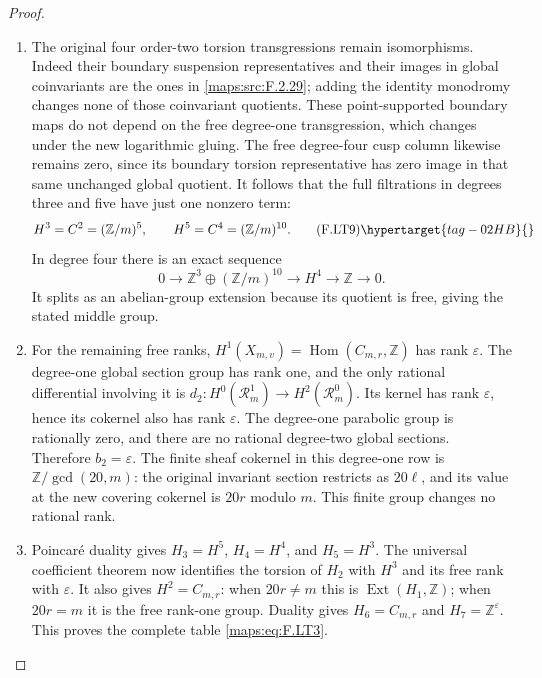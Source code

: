 \begin{proof}
\begin{enumerate}[label={$\langle1\rangle$\arabic*.}]
\item The original four order-two torsion transgressions
remain isomorphisms.
Indeed their boundary suspension representatives and
their images in global coinvariants are the ones in
\ref{maps:src:F.2.29}; adding the identity monodromy changes none
of those coinvariant quotients.
These point-supported boundary maps do not depend
on the free degree-one transgression, which changes
under the new logarithmic gluing.
The free degree-four cusp column likewise remains
zero, since its boundary torsion representative has
zero image in that same unchanged global quotient.
It follows that the full filtrations in degrees
three and five have just one nonzero term:
\[
 H^3=C^2=(\mathbb Z/m)^5,\qquad
 H^5=C^4=(\mathbb Z/m)^{10}.
\tag{F.LT9}\hypertarget{tag-02HB}{}\label{maps:eq:F.LT9}
\]
In degree four there is an exact sequence
\[
 0\longrightarrow
       \mathbb Z^3\oplus(\mathbb Z/m)^{10}
  \longrightarrow H^4
  \longrightarrow\mathbb Z\longrightarrow0.
\]
It splits as an abelian-group extension because
its quotient is free, giving the stated middle group.

\item For the remaining free ranks,
$H^1(X_{m,v})=\operatorname{Hom}(C_{m,r},\mathbb Z)$
has rank $\varepsilon$.
The degree-one global section group has rank one,
and the only rational differential involving it is
$d_2:H^0(\mathcal R_m^1)\to H^2(\mathcal R_m^0)$.
Its kernel has rank $\varepsilon$, hence its
cokernel also has rank $\varepsilon$.
The degree-one parabolic group is rationally zero,
and there are no rational degree-two global sections.
Therefore $b_2=\varepsilon$.
The finite sheaf cokernel in this degree-one row is
$\mathbb Z/\gcd(20,m)$: the original invariant
section restricts as $20\ell$, and its value at
the new covering cokernel is $20r$ modulo $m$.
This finite group changes no rational rank.

\item Poincar\'e duality gives
$H_3=H^5$, $H_4=H^4$, and $H_5=H^3$.
The universal coefficient theorem now identifies
the torsion of $H_2$ with $H^3$ and its free rank
with $\varepsilon$.
It also gives $H^2=C_{m,r}$: when $20r\ne m$ this
is $\operatorname{Ext}(H_1,\mathbb Z)$; when
$20r=m$ it is the free rank-one group.
Duality gives $H_6=C_{m,r}$ and
$H_7=\mathbb Z^\varepsilon$.
This proves the complete table \eqref{maps:eq:F.LT3}.



\end{enumerate}
\end{proof}




